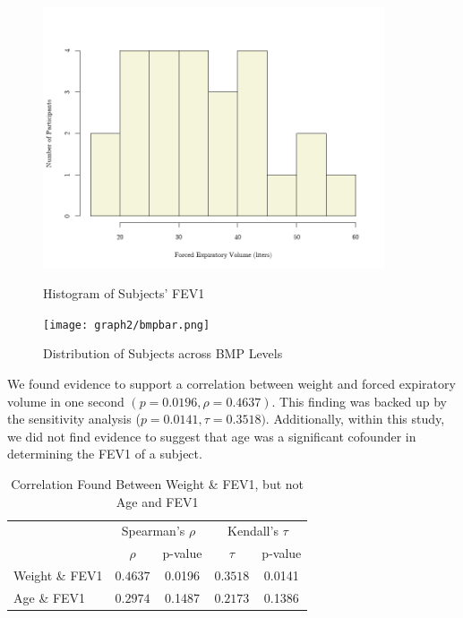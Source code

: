 \documentclass{article}
\begin{document}
		\begin{figure}[h!]
			\centering
			\tiny
			\begin{minipage}{0.46\textwidth}
			  \centering
			  \tiny
			  \includegraphics[width=0.9\textwidth]{graph2/HistFEV.png}
			  \caption{Histogram of Subjects' FEV1}
			  \label{fig:histogram}
			\end{minipage}\hfill
			\begin{minipage}{0.46\textwidth}
			  \centering
			  \tiny
			  \texttt{[image: graph2/bmpbar.png]}
			  \caption{Distribution of Subjects across BMP Levels}
			  \label{fig:boxplots}
			\end{minipage}
		\end{figure}

		We found evidence to support a correlation between weight and forced expiratory volume in one second $(p = 0.0196, \rho = 0.4637)$. This finding was backed up by the sensitivity analysis ($p = 0.0141, \tau = 0.3518)$. Additionally, within this study, we did not find evidence to suggest that age was a significant cofounder in determining the FEV1 of a subject.

		\begin{table}[h]
			\centering
			\footnotesize
			\renewcommand{\arraystretch}{1.2}
			\caption{Correlation Found Between Weight \& FEV1, but not Age and FEV1}
			\begin{tabular}{lcccc}
				\toprule
				& \multicolumn{2}{c}{Spearman’s $\rho$} & \multicolumn{2}{c}{Kendall’s $\tau$} \\
				\cmidrule(lr){2-3} \cmidrule(lr){4-5}
				& $\rho$ & p-value & $\tau$ & p-value \\
				\midrule
				Weight \& FEV1 & $0.4637$ & 0.0196 & $0.3518$ & 0.0141 \\
				Age \& FEV1 & $0.2974$ & 0.1487 & $0.2173$ & 0.1386 \\
				\bottomrule
			\end{tabular}
		\end{table}
\end{document}
